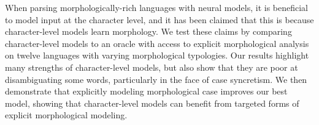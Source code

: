 When parsing morphologically-rich languages with neural models, it is beneficial to model input at the character level, and it has been claimed that this is because character-level models learn morphology. We test these claims by comparing character-level models to an oracle with access to explicit morphological analysis on twelve languages with varying morphological typologies. Our results highlight many strengths of character-level models, but also show that they are poor at disambiguating some words, particularly in the face of case syncretism. We then demonstrate that explicitly modeling morphological case improves our best model, showing that character-level models can benefit from targeted forms of explicit morphological modeling.
